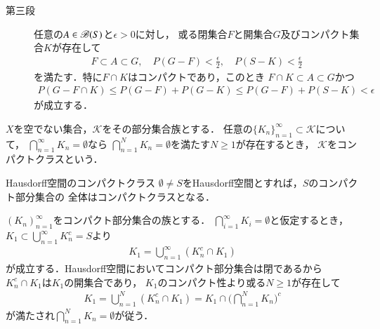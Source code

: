 \begin{prf}
\begin{description}
			\item[第三段]
				任意の$A \in \mathscr{B}(S)$と$\epsilon > 0$に対し，
				或る閉集合$F$と開集合$G$及びコンパクト集合$K$が存在して
				\begin{align}
					F \subset A \subset G,
					\quad P(G - F) < \frac{\epsilon}{2},
					\quad P(S - K) < \frac{\epsilon}{2}
				\end{align}
				を満たす．特に$F \cap K$はコンパクトであり，このとき
				$F \cap K \subset A \subset G$かつ
				\begin{align}
					P(G - F \cap K)
					\leq P(G - F) + P(G - K)
					\leq P(G - F) + P(S - K)
					< \epsilon
				\end{align}
				が成立する．
				\QED
		\end{description}
	\end{prf}
	
	\begin{screen}
		\begin{dfn}[コンパクトクラス]
			$X$を空でない集合，$\mathcal{K}$をその部分集合族とする．
			任意の$\{K_n\}_{n=1}^\infty \subset \mathcal{K}$について，
			$\bigcap_{n=1}^\infty K_n = \emptyset$なら
			$\bigcap_{n=1}^N K_n = \emptyset$を満たす$N \geq 1$が存在するとき，
			$\mathcal{K}$をコンパクトクラスという．
		\end{dfn}
	\end{screen}
	
	\begin{itembox}[l]{Hausdorff空間のコンパクトクラス}
		$\emptyset \neq S$をHausdorff空間とすれば，$S$のコンパクト部分集合の
		全体はコンパクトクラスとなる．
	\end{itembox}
	
	\begin{prf}
		$(K_n)_{n=1}^\infty$をコンパクト部分集合の族とする．
		$\bigcap_{i=1}^\infty K_i = \emptyset$と仮定するとき，
		$K_1 \subset \bigcup_{n=1}^\infty K_n^c = S$より
		\begin{align}
			K_1 = \bigcup_{n=1}^\infty \left( K_n^c \cap K_1 \right)
		\end{align}
		が成立する．Hausdorff空間においてコンパクト部分集合は閉であるから
		$K_n^c \cap K_1$は$K_1$の開集合であり，
		$K_1$のコンパクト性より或る$N \geq 1$が存在して
		\begin{align}
			K_1 = \bigcup_{n=1}^N \left( K_n^c \cap K_1 \right)
			= K_1 \cap \Biggl( \bigcap_{n=1}^N K_n \Biggr)^c
		\end{align}
		が満たされ$\bigcap_{n=1}^N K_n = \emptyset$が従う．
		\QED
	\end{prf}
	
